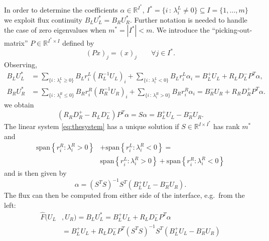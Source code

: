 \documentclass[a4paper,12pt]{article}
\theoremstyle{definition}
\theoremstyle{definition}
\begin{document}
In order to determine the coefficients $\alpha\in\mathbb{R}^{I^\ast}$,
$I^\ast = \{i \,:\, \lambda_i^L\neq 0\}\subseteq I = \{1,\ldots,m\}$
we exploit flux continuity $B_L U_L^\ast = B_R U_R^\ast$. Further notation is needed to handle
the case of zero eigenvalues when $m^\ast=|I^\ast|<m$.
We introduce the ``picking-out-matrix'' $P \in \mathbb{R}^{I^\ast\times I}$
defined by $$(P x)_j = (x)_j \qquad\forall j\in I^\ast .$$
Observing,
\begin{align*}
B_L U_L^\ast &= \sum_{\{i \,:\, \lambda_i^L\geq 0\}} B_L r_i^L (R_L^{-1} U_L)_i + \sum_{\{i \,:\, \lambda_i^L<0\}} B_L r_i^L \alpha_i
= B_L^+ U_L + R_L D_L^- P^T \alpha,\\
B_R U_R^\ast &= \sum_{\{i \,:\, \lambda_i^R\leq 0\}} B_R r_i^R (R_R^{-1} U_R)_i + \sum_{\{i \,:\, \lambda_i^R>0\}} B_R r_i^R \alpha_i
= B_R^- U_R + R_R D_R^+ P^T \alpha .
\end{align*}
we obtain
\begin{equation}\label{eq:thesystem}
(R_R D_R^+ - R_L D_L^-) P^T \alpha = S \alpha =  B_L^+ U_L - B_R^- U_R .
\end{equation}
The linear system \eqref{eq:thesystem} has a unique solution if
$S\in\mathbb{R}^{I\times I^\ast}$ has rank $m^\ast$ and
\begin{equation}
\begin{split}
\text{span}\left\{r_i^R:\lambda_i^R>0\right\} &+ \text{span}\left\{r_i^L:\lambda_i^R<0\right\} = \\
&\text{span}\left\{r_i^L:\lambda_i^R>0\right\} + \text{span}\left\{r_i^R:\lambda_i^R<0\right\}
\end{split}
\end{equation}
and is then given by
\begin{equation}
\alpha = \left( S^T S \right)^{-1} S^T \left( B_L^+ U_L - B_R^- U_R \right) .
\end{equation}
The flux can then be computed from either side of the interface, e.g.~from the left:
\begin{equation}
\begin{split}
\hat F(U_L&,U_R) = B_L U_L^\ast = B_L^+ U_L + R_L D_L^- P^T \alpha\\
&= B_L^+ U_L + R_L D_L^- P^T \left( S^T S \right)^{-1} S^T \left( B_L^+ U_L - B_R^- U_R \right)
\end{split}
\end{equation}
\end{document}
